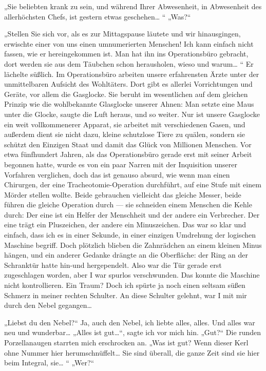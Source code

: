 „Sie beliebten krank zu sein, und während Ihrer Abwesenheit, in
Abwesenheit des allerhöchsten Chefs, ist gestern etwas geschehen\ldots{}
“ „Was?“

„Stellen Sie sich vor, als es zur Mittagspause läutete und wir
hinausgingen, erwischte einer von uns einen umnumerierten Menschen!
Ich kann einfach nicht fassen, wie er hereingekommen ist. Man hat
ihn ins Operationsbüro gebracht, dort werden sie aus dem Täubchen
schon herausholen, wieso und warum\ldots{} “ Er lächelte süßlich. Im
Operationsbüro arbeiten unsere erfahrensten Ärzte unter der
unmittelbaren Aufsicht des Wohltäters. Dort gibt es allerlei
Vorrichtungen und Geräte, vor allem die Gasglocke. Sie beruht im
wesentlichen auf dem gleichen Prinzip wie die wohlbekannte
Glasglocke unserer Ahnen: Man setzte eine Maus unter die Glocke,
saugte die Luft heraus, und so weiter. Nur ist unsere Gasglocke ein
weit vollkommenerer Apparat, sie arbeitet mit verschiedenen Gasen,
und außerdem dient sie nicht dazu, kleine schutzlose Tiere zu
quälen, sondern sie schützt den Einzigen Staat und damit das Glück
von Millionen Menschen. Vor etwa fünfhundert Jahren, als das
Operationsbüro gerade erst mit seiner Arbeit begonnen hatte, wurde
es von ein paar Narren mit der Inquisition unserer Vorfahren
verglichen, doch das ist genauso absurd, wie wenn man einen
Chirurgen, der eine Tracheotomie-Operation durchführt, auf eine
Stufe mit einem Mörder stellen wollte. Beide gebrauchen vielleicht
das gleiche Messer, beide führen die gleiche Operation durch — sie
schneiden einem Menschen die Kehle durch: Der eine ist ein Helfer
der Menschheit
und der andere ein Verbrecher. Der eine trägt ein Pluszeichen, der
andere ein Minuszeichen. Das war so klar und einfach, dass ich es
in einer Sekunde, in einer einzigen Umdrehung der logischen
Maschine begriff. Doch plötzlich blieben die Zahnrädchen an einem
kleinen Minus hängen, und ein anderer Gedanke drängte an die
Oberfläche: der Ring an der Schranktür hatte hin-und hergependelt.
Also war die Tür gerade erst zugeschlagen worden, aber I war
spurlos verschwunden. Das konnte die Maschine nicht kontrollieren.
Ein Traum? Doch ich spürte ja noch einen seltsam süßen Schmerz in
meiner rechten Schulter. An diese Schulter gelehnt, war I mit mir
durch den Nebel gegangen\ldots{}

„Liebst du den Nebel?“ Ja, auch den Nebel, ich liebte alles, alles.
Und alles war neu und wunderbar\ldots{} „Alles ist gut\ldots{}“, sagte ich
vor mich hin. „Gut?“ Die runden Porzellanaugen starrten mich
erschrocken an. „Was ist gut? Wenn dieser Kerl ohne Nummer hier
herumschnüffelt\ldots{} Sie sind überall, die ganze Zeit sind sie hier
beim Integral, sie\ldots{} “ „Wer?“

